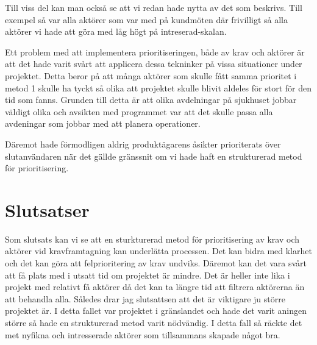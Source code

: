Till viss del kan man också se att vi redan hade nytta av det som beskrivs. Till exempel så var alla aktörer som var med på kundmöten där frivilligt så alla aktörer vi hade att göra med låg högt på intreserad-skalan. 

Ett problem med att implementera prioritiseringen, både av krav och aktörer är att det hade varit svårt att applicera dessa tekninker på vissa situationer under projektet. Detta beror på att många aktörer som skulle fått samma prioritet i metod 1 skulle ha tyckt så olika att projektet skulle blivit aldeles för stort för den tid som fanns. Grunden till detta är att olika avdelningar på sjukhuset jobbar väldigt olika och avsikten med programmet var att det skulle passa alla avdeningar som jobbar med att planera operationer. 

Däremot hade förmodligen aldrig produktägarens åsikter prioriterats över slutanvändaren när det gällde gränssnit om vi hade haft en strukturerad metod för prioritisering.


\section{Slutsatser}
Som slutsats kan vi se att en sturkturerad metod för prioritisering av krav och aktörer vid kravframtagning kan underlätta processen. Det kan bidra med klarhet och det kan göra att felprioritering av krav undviks. Däremot kan det vara svårt att få plats med i utsatt tid om projektet är mindre. Det är heller inte lika i projekt med relativt få aktörer då det kan ta längre tid att filtrera aktörerna än att behandla alla. Således drar jag slutsattsen att det är viktigare ju större projektet är. I detta fallet var projektet i gränslandet och hade det varit aningen större så hade en strukturerad metod varit nödvändig. I detta fall så räckte det met nyfikna och intresserade aktörer som tillsammans skapade något bra. 




